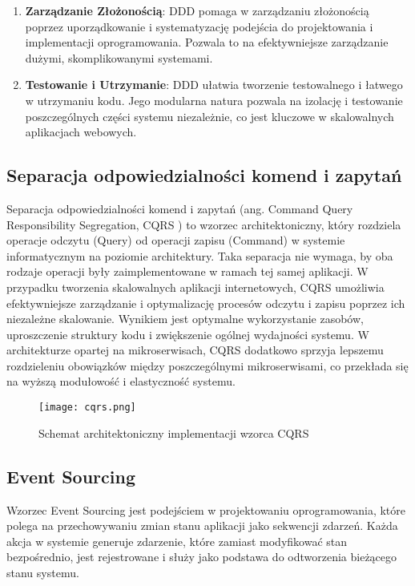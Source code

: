 \begin{enumerate}
    \item \textbf{Zarządzanie Złożonością}: DDD pomaga w zarządzaniu złożonością poprzez uporządkowanie i systematyzację podejścia do projektowania i implementacji oprogramowania. Pozwala to na efektywniejsze zarządzanie dużymi, skomplikowanymi systemami.

    \item \textbf{Testowanie i Utrzymanie}: DDD ułatwia tworzenie testowalnego i łatwego w utrzymaniu kodu. Jego modularna natura pozwala na izolację i testowanie poszczególnych części systemu niezależnie, co jest kluczowe w skalowalnych aplikacjach webowych.
\end{enumerate}

\subsection{Separacja odpowiedzialności komend i zapytań}

Separacja odpowiedzialności komend i zapytań (ang. Command Query Responsibility Segregation, CQRS \cite{cqrs}) to wzorzec architektoniczny, który rozdziela operacje odczytu (Query) od operacji zapisu (Command) w systemie informatycznym na poziomie architektury. Taka separacja nie wymaga, by oba rodzaje operacji były zaimplementowane w ramach tej samej aplikacji. W przypadku tworzenia skalowalnych aplikacji internetowych, CQRS umożliwia efektywniejsze zarządzanie i optymalizację procesów odczytu i zapisu poprzez ich niezależne skalowanie. Wynikiem jest optymalne wykorzystanie zasobów, uproszczenie struktury kodu i zwiększenie ogólnej wydajności systemu. W architekturze opartej na mikroserwisach, CQRS dodatkowo sprzyja lepszemu rozdzieleniu obowiązków między poszczególnymi mikroserwisami, co przekłada się na wyższą modułowość i elastyczność systemu.

\begin{figure}[!h]
    \centering \texttt{[image: cqrs.png]}
    \caption{Schemat architektoniczny implementacji wzorca CQRS}
\end{figure}

\subsection{Event Sourcing}

Wzorzec Event Sourcing \cite{eventsourcing} jest podejściem w projektowaniu oprogramowania, które polega na przechowywaniu zmian stanu aplikacji jako sekwencji zdarzeń. Każda akcja w systemie generuje zdarzenie, które zamiast modyfikować stan bezpośrednio, jest rejestrowane i służy jako podstawa do odtworzenia bieżącego stanu systemu.

